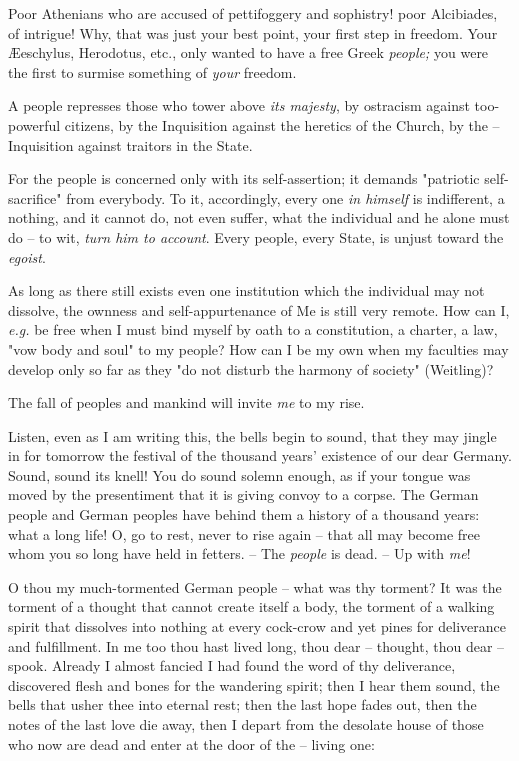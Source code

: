 \documentclass[a4paper]{book}
\begin{document}
Poor Athenians who are accused of pettifoggery and sophistry! poor Alcibiades, 
of intrigue! Why, that was just your best point, your first step in freedom. 
Your \AE{}eschylus, Herodotus, etc., only wanted to have a free Greek 
\textit{people;} you were the first to surmise something of \textit{your} 
freedom.

A people represses those who tower above \textit{its majesty}, by ostracism 
against too-powerful citizens, by the Inquisition against the heretics of the 
Church, by the -- Inquisition against traitors in the State.

For the people is concerned only with its self-assertion; it demands 
"{}patriotic self-sacrifice"{} from everybody. To it, accordingly, every one 
\textit{in himself} is indifferent, a nothing, and it cannot do, not even 
suffer, what the individual and he alone must do -- to wit, \textit{turn him 
to account}. Every people, every State, is unjust toward the \textit{egoist}.

As long as there still exists even one institution which the individual may 
not dissolve, the ownness and self-appurtenance of Me is still very remote. 
How can I, \textit{e.g.} be free when I must bind myself by oath to a 
constitution, a charter, a law, "{}vow body and soul"{} to my people? How can 
I be my own when my faculties may develop only so far as they "{}do not 
disturb the harmony of society"{} (Weitling)?

The fall of peoples and mankind will invite \textit{me} to my rise.

Listen, even as I am writing this, the bells begin to sound, that they may 
jingle in for tomorrow the festival of the thousand years' existence of our 
dear Germany. Sound, sound its knell! You do sound solemn enough, as if your 
tongue was moved by the presentiment that it is giving convoy to a corpse. The 
German people and German peoples have behind them a history of a thousand 
years: what a long life! O, go to rest, never to rise again -- that all may 
become free whom you so long have held in fetters. -- The \textit{people} is 
dead. -- Up with \textit{me}!

O thou my much-tormented German people -- what was thy torment? It was the 
torment of a thought that cannot create itself a body, the torment of a 
walking spirit that dissolves into nothing at every cock-crow and yet pines 
for deliverance and fulfillment. In me too thou hast lived long, thou dear -- 
thought, thou dear -- spook. Already I almost fancied I had found the word of 
thy deliverance, discovered flesh and bones for the wandering spirit; then I 
hear them sound, the bells that usher thee into eternal rest; then the last 
hope fades out, then the notes of the last love die away, then I depart from 
the desolate house of those who now are dead and enter at the door of the -- 
living one:
\end{document}
